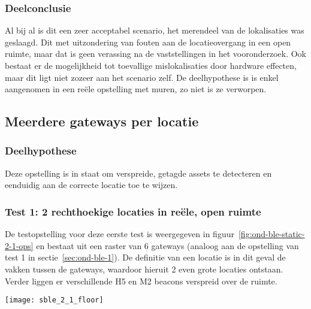 \subsubsection{Deelconclusie}
Al bij al is dit een zeer acceptabel scenario, het merendeel van de lokalisaties was geslaagd. Dit met uitzondering van fouten aan de locatieovergang in een open ruimte, maar dat is geen verassing na de vaststellingen in het vooronderzoek. Ook bestaat er de mogelijkheid tot toevallige mislokalisaties door hardware effecten, maar dit ligt niet zozeer aan het scenario zelf. De deelhypothese is is enkel aangenomen in een reële opstelling met muren, zo niet is ze verworpen.

\subsection{Meerdere gateways per locatie}
\label{sec:ond-ble-2}

\subsubsection{Deelhypothese}
Deze opstelling is in staat om verspreide, getagde assets te detecteren en eenduidig aan de correcte locatie toe te wijzen.

\subsubsection{Test 1: 2 rechthoekige locaties in reële, open ruimte}
\label{sec:ond-ble-2-1}
\begin{minipage}{0.55\textwidth}
De testopstelling voor deze eerste test is weergegeven in figuur~\ref{fig:ond-ble-static-2-1-ops} en bestaat uit een raster van 6 gateways (analoog aan de opstelling van test 1 in sectie~\ref{sec:ond-ble-1}). De definitie van een locatie is in dit geval de vakken tussen de gateways, waardoor hieruit 2 even grote locaties ontstaan. Verder liggen er verschillende H5 en M2 beacons verspreid over de ruimte.
\end{minipage}
\hfill
\begin{minipage}{0.42\textwidth}
	\texttt{[image: sble\_2\_1\_floor]}
	\label{fig:ond-ble-static-2-1-ops}
\end{minipage}

